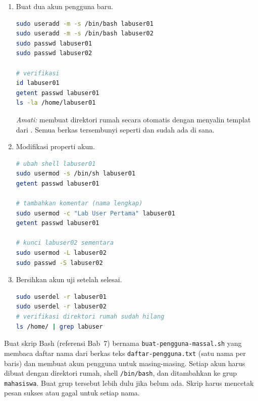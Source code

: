 \begin{enumerate}
    \item Buat dua akun pengguna baru.
\begin{lstlisting}[language=bash, caption={Membuat akun pengguna}]
sudo useradd -m -s /bin/bash labuser01
sudo useradd -m -s /bin/bash labuser02
sudo passwd labuser01
sudo passwd labuser02

# verifikasi
id labuser01
getent passwd labuser01
ls -la /home/labuser01
\end{lstlisting}

    \textit{Amati:}  membuat direktori rumah secara otomatis dengan menyalin templat dari . Semua berkas tersembunyi seperti  dan  sudah ada di sana.

    \item Modifikasi properti akun.
\begin{lstlisting}[language=bash, caption={Modifikasi akun pengguna}]
# ubah shell labuser01
sudo usermod -s /bin/sh labuser01
getent passwd labuser01

# tambahkan komentar (nama lengkap)
sudo usermod -c "Lab User Pertama" labuser01
getent passwd labuser01

# kunci labuser02 sementara
sudo usermod -L labuser02
sudo passwd -S labuser02
\end{lstlisting}

    \item Bersihkan akun uji setelah selesai.
\begin{lstlisting}[language=bash, caption={Hapus akun uji}]
sudo userdel -r labuser01
sudo userdel -r labuser02
# verifikasi direktori rumah sudah hilang
ls /home/ | grep labuser
\end{lstlisting}
\end{enumerate}

\begin{challengebox}
Buat skrip Bash (referensi Bab~7) bernama \texttt{buat-pengguna-massal.sh} yang membaca daftar nama dari berkas teks \texttt{daftar-pengguna.txt} (satu nama per baris) dan membuat akun pengguna untuk masing-masing. Setiap akun harus dibuat dengan direktori rumah, shell \texttt{/bin/bash}, dan ditambahkan ke grup \texttt{mahasiswa}. Buat grup tersebut lebih dulu jika belum ada. Skrip harus mencetak pesan sukses atau gagal untuk setiap nama.
\end{challengebox}

